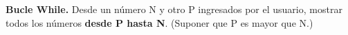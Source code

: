 \textbf{Bucle While.} Desde un n\'umero N y otro P ingresados por el usuario, mostrar todos los n\'umeros \textbf{desde P hasta N}. (Suponer que P es mayor que N.)



\volverindice
\newpage
